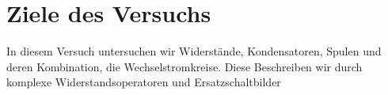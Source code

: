 \section{Ziele des Versuchs}
In diesem Versuch untersuchen wir Widerstände, Kondensatoren, Spulen und deren Kombination, die Wechselstromkreise. Diese Beschreiben wir durch komplexe Widerstandsoperatoren und Ersatzschaltbilder